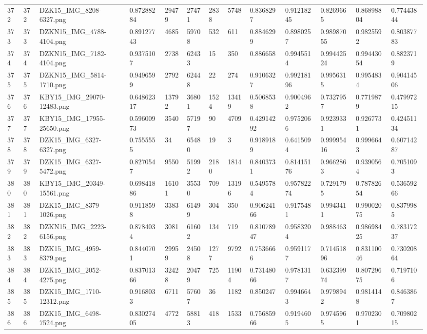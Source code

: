 \documentclass[11pt, a4paper, twoside]{report}
\begin{document}
\begin{longtable}[c]{@{}lllllllllllll@{}}
372 & 372 & DZK15\_IMG\_8208-6327.png & 0.87288284 & 29479 & 27471 & 2838 & 5748 & 0.8368297 & 0.91218245 & 0.8269665 & 0.86898804 & 0.77443844 \\
373 & 373 & DZKN15\_IMG\_4788-4104.png & 0.89127743 & 4685 & 59708 & 532 & 611 & 0.8846299 & 0.8980257 & 0.98987055 & 0.9825592 & 0.80387783 \\
374 & 374 & DZKN15\_IMG\_7182-4104.png & 0.9375107 & 2738 & 62433 & 15 & 350 & 0.886658 & 0.9945514 & 0.99442524 & 0.99443054 & 0.8823719 \\
375 & 375 & DZKN15\_IMG\_5814-1710.png & 0.9496599 & 2792 & 62448 & 22 & 274 & 0.9106327 & 0.99218196 & 0.9956315 & 0.9954834 & 0.90414506 \\
376 & 376 & KBY15\_IMG\_29070-12483.png & 0.64862317 & 13792 & 36801 & 1524 & 13419 & 0.5068538 & 0.9004962 & 0.7327957 & 0.7719879 & 0.47997215 \\
377 & 377 & KBY15\_IMG\_17955-25650.png & 0.59600973 & 3540 & 57197 & 90 & 4709 & 0.42914292 & 0.9752066 & 0.9239331 & 0.9267731 & 0.42451134 \\
378 & 378 & DZK15\_IMG\_6327-6327.png & 0.7555555 & 34 & 65480 & 19 & 3 & 0.9189189 & 0.6415094 & 0.99995416 & 0.9996643 & 0.60714287 \\
379 & 379 & DZK15\_IMG\_6327-5472.png & 0.8270547 & 9550 & 51992 & 2180 & 1814 & 0.8403731 & 0.81415176 & 0.9662863 & 0.9390564 & 0.7051093 \\
380 & 380 & KBY15\_IMG\_20349-15561.png & 0.69841886 & 16101 & 35530 & 709 & 13196 & 0.5495784 & 0.95782274 & 0.7291795 & 0.78782654 & 0.53659266 \\
381 & 381 & DZK15\_IMG\_8379-1026.png & 0.9118598 & 3383 & 61499 & 304 & 350 & 0.90624166 & 0.9175481 & 0.9943411 & 0.99002075 & 0.8379985 \\
382 & 382 & DZKN15\_IMG\_2223-6156.png & 0.8784034 & 3081 & 61602 & 134 & 719 & 0.81078947 & 0.9583204 & 0.988463 & 0.98698425 & 0.78317237 \\
383 & 383 & DZK15\_IMG\_4959-8379.png & 0.8440701 & 29959 & 24508 & 1277 & 9792 & 0.7536666 & 0.9591177 & 0.71451896 & 0.83110046 & 0.73020864 \\
384 & 384 & DZK15\_IMG\_2052-4275.png & 0.83701366 & 32428 & 20479 & 725 & 11904 & 0.73148066 & 0.9781317 & 0.63239974 & 0.80729675 & 0.7197106 \\
385 & 385 & DZK15\_IMG\_1710-12312.png & 0.9168033 & 6711 & 57607 & 36 & 1182 & 0.850247 & 0.9946643 & 0.9798942 & 0.9814148 & 0.8463867 \\
386 & 386 & DZK15\_IMG\_6498-7524.png & 0.83027405 & 4772 & 58813 & 418 & 1533 & 0.75685966 & 0.9194605 & 0.9745965 & 0.9702301 & 0.70980215 \\

\end{longtable}
\end{document}

